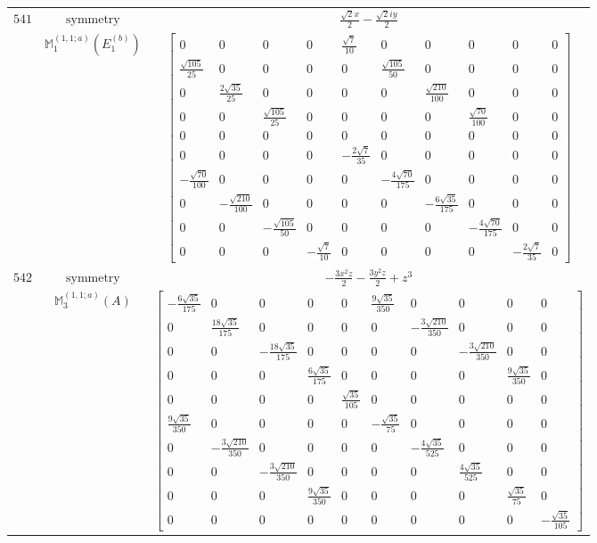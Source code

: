 \documentclass[fleqn,8pt,landscape]{jsarticle}
\begin{document}
\begin{longtable}{ccc}
$ 541 $ & $ \text{symmetry} $ & $ \frac{\sqrt{2} x}{2} - \frac{\sqrt{2} i y}{2} $ \\
$  $ & $ \mathbb{M}_{1}^{(1,1;a)}(E_{1}^{(b)}) $ & $ \begin{bmatrix} 0 & 0 & 0 & 0 & \frac{\sqrt{7}}{10} & 0 & 0 & 0 & 0 & 0 \\ \frac{\sqrt{105}}{25} & 0 & 0 & 0 & 0 & \frac{\sqrt{105}}{50} & 0 & 0 & 0 & 0 \\ 0 & \frac{2 \sqrt{35}}{25} & 0 & 0 & 0 & 0 & \frac{\sqrt{210}}{100} & 0 & 0 & 0 \\ 0 & 0 & \frac{\sqrt{105}}{25} & 0 & 0 & 0 & 0 & \frac{\sqrt{70}}{100} & 0 & 0 \\ 0 & 0 & 0 & 0 & 0 & 0 & 0 & 0 & 0 & 0 \\ 0 & 0 & 0 & 0 & - \frac{2 \sqrt{7}}{35} & 0 & 0 & 0 & 0 & 0 \\ - \frac{\sqrt{70}}{100} & 0 & 0 & 0 & 0 & - \frac{4 \sqrt{70}}{175} & 0 & 0 & 0 & 0 \\ 0 & - \frac{\sqrt{210}}{100} & 0 & 0 & 0 & 0 & - \frac{6 \sqrt{35}}{175} & 0 & 0 & 0 \\ 0 & 0 & - \frac{\sqrt{105}}{50} & 0 & 0 & 0 & 0 & - \frac{4 \sqrt{70}}{175} & 0 & 0 \\ 0 & 0 & 0 & - \frac{\sqrt{7}}{10} & 0 & 0 & 0 & 0 & - \frac{2 \sqrt{7}}{35} & 0 \end{bmatrix} $ \\ \hline
$ 542 $ & $ \text{symmetry} $ & $ - \frac{3 x^{2} z}{2} - \frac{3 y^{2} z}{2} + z^{3} $ \\
$  $ & $ \mathbb{M}_{3}^{(1,1;a)}(A) $ & $ \begin{bmatrix} - \frac{6 \sqrt{35}}{175} & 0 & 0 & 0 & 0 & \frac{9 \sqrt{35}}{350} & 0 & 0 & 0 & 0 \\ 0 & \frac{18 \sqrt{35}}{175} & 0 & 0 & 0 & 0 & - \frac{3 \sqrt{210}}{350} & 0 & 0 & 0 \\ 0 & 0 & - \frac{18 \sqrt{35}}{175} & 0 & 0 & 0 & 0 & - \frac{3 \sqrt{210}}{350} & 0 & 0 \\ 0 & 0 & 0 & \frac{6 \sqrt{35}}{175} & 0 & 0 & 0 & 0 & \frac{9 \sqrt{35}}{350} & 0 \\ 0 & 0 & 0 & 0 & \frac{\sqrt{35}}{105} & 0 & 0 & 0 & 0 & 0 \\ \frac{9 \sqrt{35}}{350} & 0 & 0 & 0 & 0 & - \frac{\sqrt{35}}{75} & 0 & 0 & 0 & 0 \\ 0 & - \frac{3 \sqrt{210}}{350} & 0 & 0 & 0 & 0 & - \frac{4 \sqrt{35}}{525} & 0 & 0 & 0 \\ 0 & 0 & - \frac{3 \sqrt{210}}{350} & 0 & 0 & 0 & 0 & \frac{4 \sqrt{35}}{525} & 0 & 0 \\ 0 & 0 & 0 & \frac{9 \sqrt{35}}{350} & 0 & 0 & 0 & 0 & \frac{\sqrt{35}}{75} & 0 \\ 0 & 0 & 0 & 0 & 0 & 0 & 0 & 0 & 0 & - \frac{\sqrt{35}}{105} \end{bmatrix} $ \\ \hline

\end{longtable}
\end{document}
